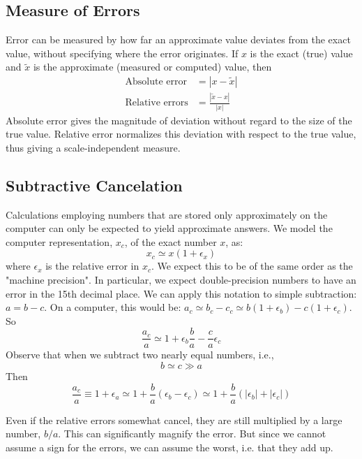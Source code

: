 \documentclass[../../../main.tex]{subfiles}
\begin{document}
\subsection{Measure of Errors}
Error can be measured by how far an approximate value deviates from the exact value, without specifying where the error originates.
If $x$ is the exact (true) value and $\tilde{x}$ is the approximate (measured or computed) value, then
\begin{align*}
    \text{Absolute error}&= |x-\tilde{x}|\\
    \text{Relative errors} &=  \frac{|\tilde{x}-x|}{|x|}
\end{align*}
Absolute error gives the magnitude of deviation without regard to the size of the true value. Relative error normalizes this deviation with respect to the true value, thus giving a scale-independent measure.

\subsection{Subtractive Cancelation}
Calculations employing numbers that are stored only approximately on the computer can only be expected to yield approximate answers. 
We model the computer representation, $x_c$, of the exact number $x$, as:
\begin{equation*}
    x_c \simeq x ( 1 + \epsilon_x )
\end{equation*}
where $\epsilon_x$ is the relative error in $x_c$. 
We expect this to be of the same order as the "machine precision". In particular, we expect double-precision numbers to have an error in the 15th decimal place. 
We can apply this notation to simple subtraction: $a = b - c$.
On a computer, this would be: $a_c \simeq b_c - c_c \simeq b(1+\epsilon_b) - c( 1 + \epsilon_c)$.
So
\begin{equation*}
    \frac{a_c}{a} \simeq 1 + \epsilon_b \frac{b}{a} - \frac{c}{a} \epsilon_c
\end{equation*}
Observe that when we subtract two nearly equal numbers, i.e.,
\begin{equation*}
    b \simeq c \gg a
\end{equation*}
Then
\begin{equation*}
    \frac{a_c}{a} \equiv 1 + \epsilon_a \simeq 1 + \frac{b}{a} (\epsilon_b - \epsilon_c) \simeq 1 + \frac{b}{a}(|\epsilon_b|+|\epsilon_c|)
\end{equation*}

Even if the relative errors somewhat cancel, they are still multiplied by a large number, $b/a$. 
This can significantly magnify the error. But since we cannot assume a sign for the errors, we can assume the worst, i.e. that they add up. 
\end{document}
